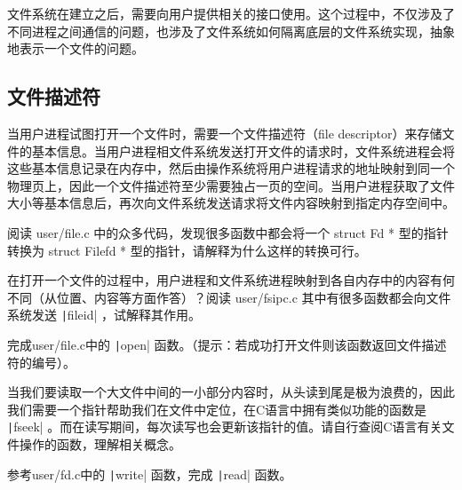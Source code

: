 文件系统在建立之后，需要向用户提供相关的接口使用。这个过程中，不仅涉及了不同进程之间通信的问题，也涉及了文件系统如何隔离底层的文件系统实现，抽象地表示一个文件的问题。

\subsection{文件描述符}

当用户进程试图打开一个文件时，需要一个文件描述符（file descriptor）来存储文件的基本信息。当用户进程相文件系统发送打开文件的请求时，文件系统进程会将这些基本信息记录在内存中，然后由操作系统将用户进程请求的地址映射到同一个物理页上，因此一个文件描述符至少需要独占一页的空间。当用户进程获取了文件大小等基本信息后，再次向文件系统发送请求将文件内容映射到指定内存空间中。

\begin{thinking}\label{think-Filefd-Fd}
阅读 user/file.c 中的众多代码，发现很多函数中都会将一个 struct Fd * 型的指针转换为 struct Filefd * 型的指针，请解释为什么这样的转换可行。
\end{thinking}

\begin{thinking}\label{think-fileid}
在打开一个文件的过程中，用户进程和文件系统进程映射到各自内存中的内容有何不同（从位置、内容等方面作答）？阅读 user/fsipc.c 其中有很多函数都会向文件系统发送 \texttt|fileid| ，试解释其作用。
\end{thinking}

\begin{exercise}
完成user/file.c中的 \texttt|open| 函数。（提示：若成功打开文件则该函数返回文件描述符的编号）。
\end{exercise}

当我们要读取一个大文件中间的一小部分内容时，从头读到尾是极为浪费的，因此我们需要一个指针帮助我们在文件中定位，在C语言中拥有类似功能的函数是 \texttt|fseek| 。而在读写期间，每次读写也会更新该指针的值。请自行查阅C语言有关文件操作的函数，理解相关概念。

\begin{exercise}
参考user/fd.c中的 \texttt|write| 函数，完成 \texttt|read| 函数。
\end{exercise}


